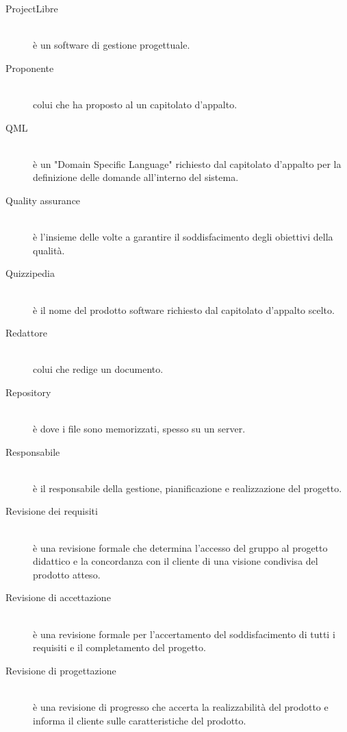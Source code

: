 \documentclass[12pt,a4paper]{article}
\begin{document}
\begin{description}
\item[ProjectLibre] 
\hfill\\ è un software di gestione progettuale.

\item[Proponente] 
\hfill\\ colui che ha proposto al  un capitolato d'appalto.

\item[QML] 
\hfill\\ è un "Domain Specific Language" richiesto dal capitolato d'appalto per la definizione delle domande all'interno del sistema.

\item[Quality assurance] 
\hfill\\ è l'insieme delle  volte a garantire il soddisfacimento degli obiettivi della qualità.

\item[Quizzipedia] 
\hfill\\ è il nome del prodotto software richiesto dal capitolato d'appalto scelto.

\item[Redattore] 
\hfill\\colui che redige un documento.

\item[Repository] 
\hfill\\è dove i file sono memorizzati, spesso su un server.

\item[Responsabile] 
\hfill\\è il responsabile della gestione, pianificazione e realizzazione del progetto.

\item[Revisione dei requisiti] 
\hfill\\è una revisione formale che determina l'accesso del gruppo al progetto didattico e la concordanza con il cliente di una visione condivisa del prodotto atteso.

\item[Revisione di accettazione] 
\hfill\\è una revisione formale per l'accertamento del soddisfacimento di tutti i requisiti e il completamento del progetto.

\item[Revisione di progettazione] 
\hfill\\è una revisione di progresso che accerta la realizzabilità del prodotto e informa il cliente sulle caratteristiche del prodotto.


\end{description}
\end{document}
